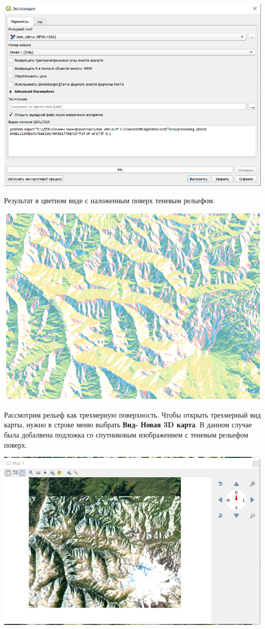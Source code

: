 \documentclass[
]{book}
\begin{document}
\includegraphics{figures/77.PNG}

Результат в цветном виде с наложенным поверх теневым рельефом.

\includegraphics{figures/78.PNG}

Рассмотрим рельеф как трехмерную поверхность. Чтобы открыть трехмерный вид карты, нужно в строке меню выбрать \textbf{Вид- Новая 3D карта}. В данном случае была добалвена подложка со спутниковым изображением с теневым рельефом поверх.

\includegraphics{figures/79.PNG}
\end{document}
